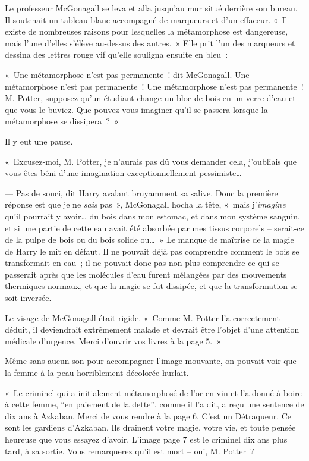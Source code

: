 Le professeur McGonagall se leva et alla jusqu'au mur situé derrière son bureau. Il soutenait un tableau blanc accompagné de marqueurs et d'un effaceur. «~Il existe de nombreuses raisons pour lesquelles la métamorphose est dangereuse, mais l'une d'elles s'élève au-dessus des autres.~» Elle prit l'un des marqueurs et dessina des lettres rouge vif qu'elle souligna ensuite en bleu~:


«~Une métamorphose n'est pas permanente~! dit McGonagall. Une métamorphose n'est pas permanente~! Une métamorphose n'est pas permanente~! M. Potter, supposez qu'un étudiant change un bloc de bois en un verre d'eau et que vous le buviez. Que pouvez-vous imaginer qu'il se passera lorsque la métamorphose se dissipera~?~»

Il y eut une pause.

«~Excusez-moi, M. Potter, je n'aurais pas dû vous demander cela, j'oubliais que vous êtes béni d'une imagination exceptionnellement pessimiste…

--- Pas de souci, dit Harry avalant bruyamment sa salive. Donc la première réponse est que je ne \emph{sais} pas~», McGonagall hocha la tête, «~mais j'\emph{imagine} qu'il pourrait y avoir… du bois dans mon estomac, et dans mon système sanguin, et si une partie de cette eau avait été absorbée par mes tissus corporels -- serait-ce de la pulpe de bois ou du bois solide ou…~» Le manque de maîtrise de la magie de Harry le mit en défaut. Il ne pouvait déjà pas comprendre comment le bois se transformait en eau~; il ne pouvait donc pas non plus comprendre ce qui se passerait après que les molécules d'eau furent mélangées par des mouvements thermiques normaux, et que la magie se fut dissipée, et que la transformation se soit inversée.

Le visage de McGonagall était rigide. «~Comme M. Potter l'a correctement déduit, il deviendrait extrêmement malade et devrait être l'objet d'une attention médicale d'urgence. Merci d'ouvrir vos livres à la page 5.~»

Même sans aucun son pour accompagner l'image mouvante, on pouvait voir que la femme à la peau horriblement décolorée hurlait.

«~Le criminel qui a initialement métamorphosé de l'or en vin et l'a donné à boire à cette femme, “en paiement de la dette”, comme il l'a dit, a reçu une sentence de dix ans à Azkaban. Merci de vous rendre à la page 6. C'est un Détraqueur. Ce sont les gardiens d'Azkaban. Ils drainent votre magie, votre vie, et toute pensée heureuse que vous essayez d'avoir. L'image page 7 est le criminel dix ans plus tard, à sa sortie. Vous remarquerez qu'il est mort -- oui, M. Potter~?

